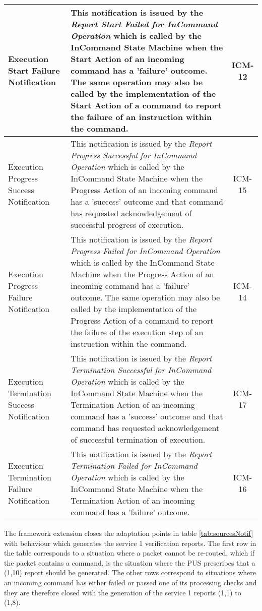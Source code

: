 \documentclass{pnp_article}
\begin{document}
\begin{longtable}{|>{\raggedright\arraybackslash}p{2.1cm}|>{\raggedright\arraybackslash}p{9.8cm}|c|}
\hline 
Execution Start Failure Notification &  This notification is issued by the \textit{Report Start Failed for InCommand Operation} which is called by the InCommand State Machine when the Start Action of an incoming command has a 'failure' outcome. The same operation may also be called by the implementation of the Start Action of a command to report the failure of an instruction within the command. & ICM-12 \\
\hline
Execution Progress Success Notification &  This notification is issued by the \textit{Report Progress Successful for InCommand Operation} which is called by the InCommand State Machine when the Progress Action of an incoming command has a 'success' outcome and that command has requested acknowledgement of successful progress of execution. & ICM-15 \\
\hline
Execution Progress Failure Notification &  This notification is issued by the \textit{Report Progress Failed for InCommand Operation} which is called by the InCommand State Machine when the Progress Action of an incoming command has a 'failure' outcome. The same operation may also be called by the implementation of the Progress Action of a command to report the failure of the execution step of an instruction within the command. & ICM-14 \\
\hline 
Execution Termination Success Notification &  This notification is issued by the  \textit{Report Termination Successful for InCommand Operation} which is called by the InCommand State Machine when the Termination Action of an incoming command has a 'success' outcome and that command has requested acknowledgement of successful termination of execution. & ICM-17 \\
\hline
Execution Termination Failure Notification &  This notification is issued by the \textit{Report Termination Failed for InCommand Operation} which is called by the InCommand State Machine when the Termination Action of an incoming command has a 'failure' outcome. & ICM-16 \\
\hline
\end{longtable} 

The framework extension closes the adaptation points in table \ref{tab:sourcesNotif} with behaviour which generates the service 1 verification reports. The first row in the table corresponds to a situation where a packet cannot be re-routed, which if the packet contains a command, is the situation where the PUS prescribes that a (1,10) report should be generated. The other rows correspond to situations where an incoming command has either failed or passed one of its processing checks and they are therefore closed with the generation of the service 1 reports (1,1) to (1,8). 
\end{document}
